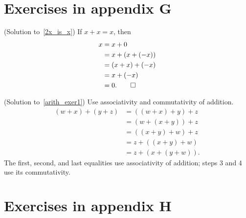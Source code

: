 













\section{Exercises in appendix G}

\begin{prf}\label{sol_2x_is_x}(Solution to~\ref{2x_is_x})
If $x + x = x$, then
\begin{align*} x &= x + 0 \\
                 &= x + (x + (-x)) \\
                 &= (x + x) + (-x) \\
                 &= x + (-x) \\
                 &= 0.       \qedhere
\end{align*}
\end{prf}

\begin{prf}\label{sol_arith_exer1}(Solution to~\ref{arith_exer1})
Use associativity and commutativity of addition.
  \begin{align*}
     (w + x) + (y + z)  &= ((w + x) + y) + z \\
                        &= (w + (x + y)) + z \\
                        &= ((x + y) + w) + z \\
                        &= z + ((x + y) + w) \\
                        &= z + (x + (y + w)).
  \end{align*}
The first, second, and last equalities use associativity of addition; steps 3 and 4 use its
commutativity.
\end{prf}



















\section{Exercises in appendix H}

